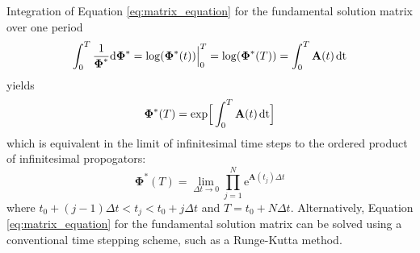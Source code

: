 \documentclass{article}
\begin{document}
Integration of Equation \ref{eq:matrix_equation} for the fundamental solution matrix 
over one 
period 
\begin{equation}
 \int_0^T\frac{1}{\boldsymbol{\Phi}^*}\mathrm{d\boldsymbol{\Phi}^*}
 =\log(\boldsymbol{\Phi}^*(t))\Big|_0^T=\log(\boldsymbol{\Phi}^*(T))
 =\int_0^T\mathbf{A}(t)\hspace{0.5mm}\mathrm{dt}
\end{equation}
yields
\begin{equation}
 \boldsymbol{\Phi}^*(T)=\text{exp}\Big[\int_0^T\mathbf{A}(t)\hspace{0.5mm}\mathrm{dt}\Big]
\end{equation}
which is equivalent in the limit of infinitesimal time steps to the ordered product
of infinitesimal propogators:
\begin{equation}
 \boldsymbol{\Phi}^*(T)=\lim_{\Delta{t}\rightarrow0}\prod_{j=1}^N\mathrm{e}^{\mathbf{A}(t_j)\Delta{t}}
 \label{eq:ordered_product}
\end{equation}
where $t_0+(j-1)\Delta{t}<t_j<t_0+j\Delta{t}$ and $T=t_0+N\Delta{t}$. Alternatively,
Equation \ref{eq:matrix_equation} for the fundamental solution matrix can be solved 
using a conventional time stepping scheme, such as a Runge-Kutta method.


\newpage
\end{document}
